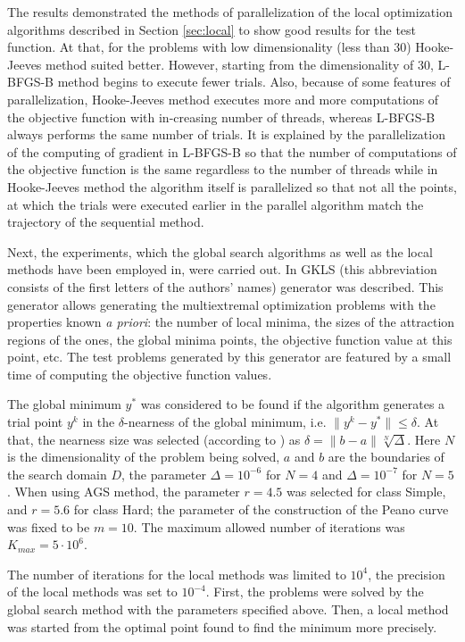 \documentclass[runningheads]{llncs}
\begin{document}
The results demonstrated the methods of parallelization of the local optimization algorithms described in Section \ref{sec:local} to show good results for the test function. At that, for the problems with low dimensionality (less than 30) Hooke-Jeeves method suited better. However, starting from the dimensionality of 30, L-BFGS-B method begins to execute fewer trials. Also, because of some features of parallelization, Hooke-Jeeves method executes more and more computations of the objective function with in-creasing number of threads, whereas L-BFGS-B always performs the same number of trials. It is explained by the parallelization of the computing of gradient in L-BFGS-B so that the number of computations of the objective function is the same regardless to the number of threads while in Hooke-Jeeves method the algorithm itself is parallelized so that not all the points, at which the trials were executed earlier in the parallel algorithm match the trajectory of the sequential method.

Next, the experiments, which the global search algorithms as well as the local methods have been employed in, were carried out. In \cite{Gaviano2003} GKLS (this abbreviation consists of the first letters of the authors’ names) generator was described. This generator allows generating the multiextremal optimization problems with the properties known \textit{a priori}: the number of local minima, the sizes of the attraction regions of the ones, the global minima points, the objective function value at this point, etc. The test problems generated by this generator are featured by a small time of computing the objective function values.

The global minimum $y^*$ was considered to be found if the algorithm generates a trial point $y^k$ in the $\delta$-nearness of the global minimum, i.e. $\|y^k -y^*\| \leq \delta$. At that, the nearness size was selected (according to \cite{7}) as $\delta = \| b - a \|\sqrt[N]{\Delta}$. Here $N$ is the dimensionality of the problem being solved, $a$ and $b$ are the boundaries of the search domain $D$, the parameter $\Delta = 10^{-6}$ for $N = 4$ and $\Delta = 10^{-7}$ for $N = 5$. When using AGS method, the parameter $r=4.5$ was selected for class Simple, and $r=5.6$ for class Hard; the parameter of the construction of the Peano curve was fixed to be $m=10$. The maximum allowed number of iterations was $K_{max}= 5\cdot10^6$.

The number of iterations for the local methods was limited to $10^4$, the precision of the local methods was set to $10^{-4}$. First, the problems were solved by the global search method with the parameters specified above. Then, a local method was started from the optimal point found to find the minimum more precisely.
\end{document}
